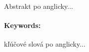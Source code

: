 \documentclass[12pt, twoside]{book}
\begin{document}
Abstrakt po anglicky...


\paragraph*{Keywords:} kľúčové slová po anglicky...


%
%



\newpage 

\tableofcontents



\newpage 

\listoffigures
\listoftables


\mainmatter


 









%









\newpage	

\backmatter

\thispagestyle{empty}
\clearpage


 
\end{document}
